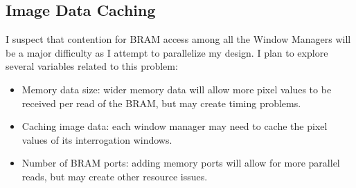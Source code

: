 \documentclass{article}
\begin{document}
\subsection{Image Data Caching}
I suspect that contention for BRAM access among all the Window Managers will be a major difficulty as I attempt to parallelize my design. I plan to explore several variables related to this problem: 
\begin{itemize}
	\item Memory data size: wider memory data will allow more pixel values to be received per read of the BRAM, but may create timing problems.
	\item Caching image data: each window manager may need to cache the pixel values of its interrogation windows.
	\item Number of BRAM ports: adding memory ports will allow for more parallel reads, but may create other resource issues.
\end{itemize}

	
	
\end{document}
